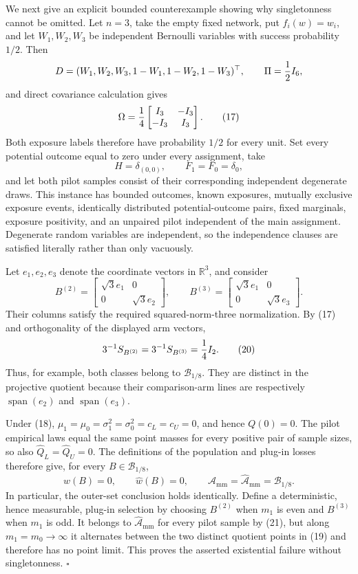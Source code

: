 We next give an explicit bounded counterexample showing why singletonness cannot be omitted.  Let \(n=3\), take the empty fixed network, put \(f_i(w)=w_i\), and let \(W_1,W_2,W_3\) be independent Bernoulli variables with success probability \(1/2\).  Then
\[
D=(W_1,W_2,W_3,1-W_1,1-W_2,1-W_3)^{\top},
\qquad
\Pi={1\over2}I_6,
\]
and direct covariance calculation gives
\[
\Omega={1\over4}
\begin{bmatrix}
I_3&-I_3\\
-I_3&I_3
\end{bmatrix}.
\tag{17}
\]
Both exposure labels therefore have probability \(1/2\) for every unit.  Set every potential outcome equal to zero under every assignment, take
\[
H=\delta_{(0,0)},
\qquad
F_1=F_0=\delta_0,
\tag{18}
\]
and let both pilot samples consist of their corresponding independent degenerate draws.  This instance has bounded outcomes, known exposures, mutually exclusive exposure events, identically distributed potential-outcome pairs, fixed marginals, exposure positivity, and an unpaired pilot independent of the main assignment.  Degenerate random variables are independent, so the independence clauses are satisfied literally rather than only vacuously.

Let \(e_1,e_2,e_3\) denote the coordinate vectors in \(\mathbb R^3\), and consider
\[
B^{(2)}=
\begin{bmatrix}\sqrt3e_1&0\\0&\sqrt3e_2\end{bmatrix},
\qquad
B^{(3)}=
\begin{bmatrix}\sqrt3e_1&0\\0&\sqrt3e_3\end{bmatrix}.
\tag{19}
\]
Their columns satisfy the required squared-norm-three normalization.  By (17) and orthogonality of the displayed arm vectors,
\[
3^{-1}S_{B^{(2)}}=3^{-1}S_{B^{(3)}}={1\over4}I_2.
\tag{20}
\]
Thus, for example, both classes belong to \(\mathcal B_{1/8}\).  They are distinct in the projective quotient because their comparison-arm lines are respectively \(\operatorname{span}(e_2)\) and \(\operatorname{span}(e_3)\).

Under (18), \(\mu_1=\mu_0=\sigma_1^2=\sigma_0^2=c_L=c_U=0\), and hence \(Q(0)=0\).  The pilot empirical laws equal the same point masses for every positive pair of sample sizes, so also \(\widehat Q_L=\widehat Q_U=0\).  The definitions of the population and plug-in losses therefore give, for every \(B\in\mathcal B_{1/8}\),
\[
w(B)=0,
\qquad
\widehat w(B)=0,
\qquad
\mathcal A_{\mathrm{mm}}
=\widehat{\mathcal A}_{\mathrm{mm}}
=\mathcal B_{1/8}.
\tag{21}
\]
In particular, the outer-set conclusion holds identically.  Define a deterministic, hence measurable, plug-in selection by choosing \(B^{(2)}\) when \(m_1\) is even and \(B^{(3)}\) when \(m_1\) is odd.  It belongs to \(\widehat{\mathcal A}_{\mathrm{mm}}\) for every pilot sample by (21), but along \(m_1=m_0\to\infty\) it alternates between the two distinct quotient points in (19) and therefore has no point limit.  This proves the asserted existential failure without singletonness. \(\square\)
